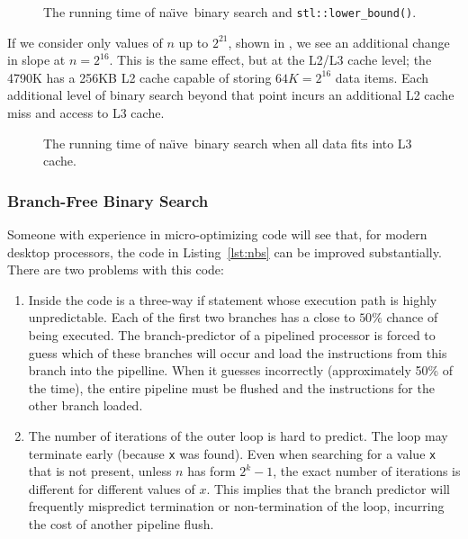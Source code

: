 \documentclass{patmorin}
\newcommand{\lstref}[1]{Listing~\ref{lst:#1}}
\newcommand{\naive}{na\"{\i}ve}
\begin{document}
\begin{figure}
   \caption{The running time of \naive\ binary search and \texttt{stl::lower_bound()}.}
\end{figure}

If we consider only values of $n$ up to $2^{21}$, shown in
, we see an additional change in slope at
$n=2^{16}$.  This is the same effect, but at the L2/L3 cache level; the
4790K has a 256KB L2 cache capable of storing $64K=2^{16}$ data items.
Each additional level of binary search beyond that point incurs an
additional L2 cache miss and access to L3 cache.

\begin{figure}
   \caption{The running time of \naive\ binary search when all data
    fits into L3 cache.}
\end{figure}


\subsubsection{Branch-Free Binary Search}

Someone with experience in micro-optimizing code will see that, for
modern desktop processors, the code in \lstref{nbs} can be improved
substantially.  There are two problems with this code:

\begin{enumerate}

\item Inside the code is a three-way if statement whose execution path
is highly unpredictable. Each of the first two branches has a close to
$50\%$ chance of being executed.  The branch-predictor of a pipelined
processor is forced to guess which of these branches will occur and load
the instructions from this branch into the pipelline.  When it guesses
incorrectly (approximately 50\% of the time), the entire pipeline must be
flushed and the instructions for the other branch loaded.

\item The number of iterations of the outer loop is hard to predict. The
loop may terminate early (because \texttt{x} was found). Even when
searching for a value \texttt{x} that is not present, unless $n$ has
form $2^k-1$, the exact number of iterations is different for different
values of $x$.  This implies that the branch predictor will frequently
mispredict termination or non-termination of the loop, incurring the
cost of another pipeline flush.

\end{enumerate}
\end{document}
